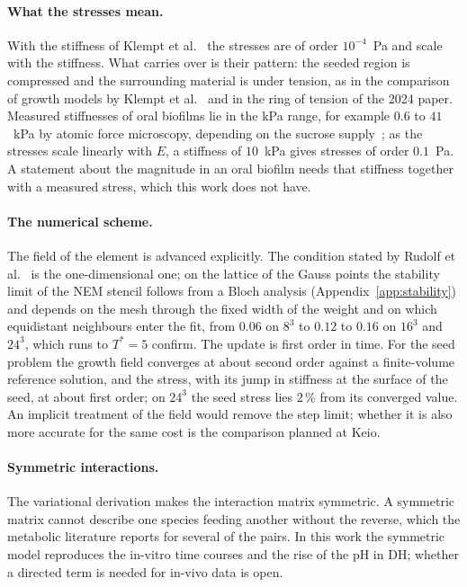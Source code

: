 \paragraph{What the stresses mean.} With the stiffness of Klempt et
al.~\cite{Klempt2024DiffusionDrivenGrowth} the stresses are of order
$10^{-4}$~Pa and scale with the stiffness. What carries over is their pattern:
the seeded region is compressed and the surrounding material is under tension,
as in the comparison of growth models by Klempt et
al.~\cite{Klempt2023NumericalComparison} and in the ring of tension of the 2024
paper. Measured stiffnesses of oral biofilms lie in the kPa range, for example
$0.6$ to $41$~kPa by atomic force microscopy, depending on the sucrose
supply~\cite{Pattem2018}; as the stresses scale linearly with $E$, a stiffness
of $10$~kPa gives stresses of order $0.1$~Pa. A statement about the magnitude
in an oral biofilm needs that stiffness together with a measured stress, which
this work does not have.

\paragraph{The numerical scheme.} The field of the element is advanced
explicitly. The condition stated by Rudolf et al.~\cite{Rudolf2025NEM} is the
one-dimensional one; on the lattice of the Gauss points the stability
limit of the NEM stencil follows from a Bloch analysis
(Appendix~\ref{app:stability}) and depends on the mesh through the fixed width
of the weight and on which equidistant neighbours enter the fit, from
$0.06$ on $8^3$ to $0.12$ to $0.16$ on $16^3$ and $24^3$, which runs to
$T^*=5$ confirm. The update is first order in time. For the seed
problem the growth field converges at about second order against a
finite-volume reference solution, and the stress, with its jump in stiffness
at the surface of the seed, at about first order; on $24^3$ the seed stress
lies $2\,\%$ from its converged value.
An implicit treatment of the field would remove the step limit; whether it is
also more accurate for the same cost is the comparison planned at Keio.

\paragraph{Symmetric interactions.} The variational derivation makes the
interaction matrix symmetric. A symmetric matrix cannot describe one species
feeding another without the reverse, which the metabolic literature reports for
several of the pairs. In this work the symmetric model reproduces the
in-vitro time courses and the rise of the pH in DH; whether a directed term is needed
for in-vivo data is open.

